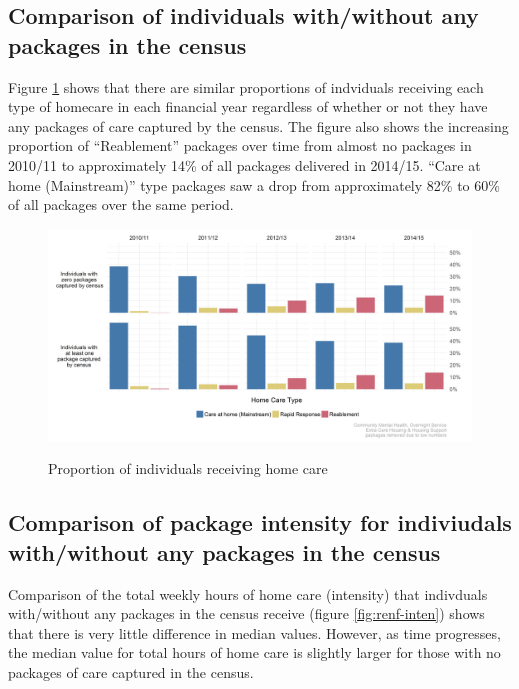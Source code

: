 \documentclass[]{article}
\begin{document}
\FloatBarrier
\subsection{Comparison of individuals with/without any packages in the census}\label{subsec:renf-pack-diff}

Figure \ref{fig:renf-prop-plot} shows that there are similar proportions
of indviduals receiving each type of homecare in each financial year
regardless of whether or not they have any packages of care captured by
the census. The figure also shows the increasing proportion of
``Reablement'' packages over time from almost no packages in 2010/11 to
approximately 14\% of all packages delivered in 2014/15. ``Care at home
(Mainstream)'' type packages saw a drop from approximately 82\% to 60\%
of all packages over the same period.

\begin{figure}[h]
  \centering
    \caption{Proportion of individuals receiving home care}
    \includegraphics{figures/chapter-renf/12-census-prop-plot.png}
    \label{fig:renf-prop-plot}
\end{figure}

\subsection{Comparison of package intensity for indiviudals with/without any packages in the census}\label{subsec:renf-inten-diff}

Comparison of the total weekly hours of home care (intensity) that
indivduals with/without any packages in the census receive (figure
\ref{fig:renf-inten}) shows that there is very little difference in
median values. However, as time progresses, the median value for total
hours of home care is slightly larger for those with no packages of care
captured in the census.
\end{document}
